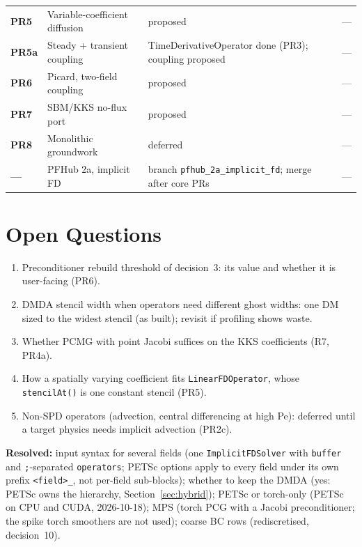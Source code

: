 \documentclass[11pt]{article}
\begin{document}
\begin{longtable}{>{\bfseries}p{} p{} p{} p{}}
PR5 & Variable-coefficient diffusion & proposed & --- \\
PR5a & Steady + transient coupling & TimeDerivativeOperator done (PR3); coupling proposed & --- \\
PR6 & Picard, two-field coupling & proposed & --- \\
PR7 & SBM/KKS no-flux port & proposed & --- \\
PR8 & Monolithic groundwork & deferred & --- \\
--- & PFHub 2a, implicit FD & branch \texttt{pfhub\_2a\_implicit\_fd}; merge after core PRs & --- \\
\bottomrule
\end{longtable}

\section{Open Questions}

\begin{enumerate}[leftmargin=*]
\item Preconditioner rebuild threshold of decision~3: its value and whether
it is user-facing (PR6).
\item DMDA stencil width when operators need different ghost widths: one DM
sized to the widest stencil (as built); revisit if profiling shows waste.
\item Whether PCMG with point Jacobi suffices on the KKS coefficients (R7,
PR4a).
\item How a spatially varying coefficient fits \texttt{LinearFDOperator},
whose \texttt{stencilAt()} is one constant stencil (PR5).
\item Non-SPD operators (advection, central differencing at high Pe):
deferred until a target physics needs implicit advection (PR2c).
\end{enumerate}

\textbf{Resolved:} input syntax for several fields (one
\texttt{ImplicitFDSolver} with \texttt{buffer} and \texttt{;}-separated
\texttt{operators}; PETSc options apply to every field under its own prefix
\texttt{<field>\_}, not per-field sub-blocks); whether to keep the DMDA
(yes: PETSc owns the hierarchy, Section~\ref{sec:hybrid}); PETSc or
torch-only (PETSc on CPU and CUDA, 2026-10-18); MPS (torch PCG with a Jacobi
preconditioner; the spike torch smoothers are not used); coarse BC rows
(rediscretised, decision~10).
\end{document}
